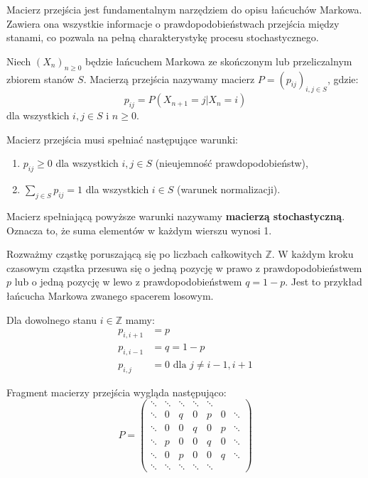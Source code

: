\documentclass[final,a4paper,openany,12pt]{mwbk}
\begin{document}
Macierz przejścia jest fundamentalnym narzędziem do opisu łańcuchów Markowa. Zawiera ona wszystkie informacje o prawdopodobieństwach przejścia między stanami, co pozwala na pełną charakterystykę procesu stochastycznego.

\begin{Def}
Niech $(X_n)_{n \geq 0}$ będzie łańcuchem Markowa ze skończonym lub przeliczalnym zbiorem stanów $S$. Macierzą przejścia nazywamy macierz $P = (p_{ij})_{i,j \in S}$, gdzie:
$$p_{ij} = P(X_{n+1} = j | X_n = i)$$
dla wszystkich $i, j \in S$ i $n \geq 0$.
\end{Def}

Macierz przejścia musi spełniać następujące warunki:
\begin{enumerate}
    \item $p_{ij} \geq 0$ dla wszystkich $i, j \in S$ (nieujemność prawdopodobieństw),
    \item $\sum_{j \in S} p_{ij} = 1$ dla wszystkich $i \in S$ (warunek normalizacji).
\end{enumerate}

Macierz spełniającą powyższe warunki nazywamy \textbf{macierzą stochastyczną}. Oznacza to, że suma elementów w każdym wierszu wynosi 1.

\begin{Prz}
Rozważmy cząstkę poruszającą się po liczbach całkowitych $\mathbb{Z}$. W każdym kroku czasowym cząstka przesuwa się o jedną pozycję w prawo z prawdopodobieństwem $p$ lub o jedną pozycję w lewo z prawdopodobieństwem $q = 1-p$. Jest to przykład łańcucha Markowa zwanego spacerem losowym.

Dla dowolnego stanu $i \in \mathbb{Z}$ mamy:
\begin{align}
p_{i,i+1} &= p \\
p_{i,i-1} &= q = 1-p \\
p_{i,j} &= 0 \text{ dla } j \neq i-1, i+1
\end{align}

Fragment macierzy przejścia wygląda następująco:
$$P = \begin{pmatrix}
\ddots & \ddots & \ddots & \ddots & \ddots \\
\ddots & 0 & q & 0 & p & 0 & \ddots \\
\ddots & 0 & 0 & q & 0 & p & \ddots \\
\ddots & p & 0 & 0 & q & 0 & \ddots \\
\ddots & 0 & p & 0 & 0 & q & \ddots \\
\ddots & \ddots & \ddots & \ddots & \ddots
\end{pmatrix}$$
\end{Prz}
\end{document}
